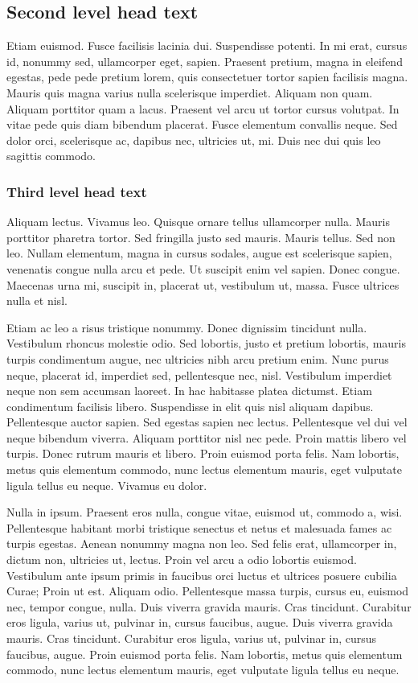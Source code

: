 \documentclass[CJCE,STIX2COL]{WileyNJD-v2}
\begin{document}
\subsection{Second level head text}

Etiam euismod. Fusce facilisis lacinia dui. Suspendisse potenti. In mi erat, cursus id, nonummy sed, ullamcorper
eget, sapien. Praesent pretium, magna in eleifend egestas, pede pede pretium lorem, quis consectetuer tortor sapien
facilisis magna. Mauris quis magna varius nulla scelerisque imperdiet. Aliquam non quam. Aliquam porttitor quam
a lacus. Praesent vel arcu ut tortor cursus volutpat. In vitae pede quis diam bibendum placerat. Fusce elementum
convallis neque. Sed dolor orci, scelerisque ac, dapibus nec, ultricies ut, mi. Duis nec dui quis leo sagittis commodo.

\subsubsection{Third level head text}

Aliquam lectus. Vivamus leo. Quisque ornare tellus ullamcorper nulla. Mauris porttitor pharetra tortor. Sed fringilla
justo sed mauris. Mauris tellus. Sed non leo. Nullam elementum\cite{ennis1994}, magna in cursus sodales, augue est scelerisque
sapien, venenatis congue nulla arcu et pede. Ut suscipit enim vel sapien. Donec congue. Maecenas urna mi, suscipit
in, placerat ut, vestibulum ut, massa. Fusce ultrices nulla et nisl.

Etiam ac leo a risus tristique nonummy. Donec dignissim tincidunt nulla. Vestibulum rhoncus molestie odio. Sed
lobortis, justo et pretium lobortis, mauris turpis condimentum augue, nec ultricies nibh arcu pretium enim. Nunc
purus neque, placerat id, imperdiet sed, pellentesque nec, nisl. Vestibulum imperdiet neque non sem accumsan laoreet.
In hac habitasse platea dictumst. Etiam condimentum facilisis libero. Suspendisse in elit quis nisl aliquam dapibus.
Pellentesque auctor sapien. Sed egestas sapien nec lectus. Pellentesque vel dui vel neque bibendum viverra. Aliquam
porttitor nisl nec pede. Proin mattis libero vel turpis. Donec rutrum mauris et libero. Proin euismod porta felis.
Nam lobortis, metus quis elementum commodo, nunc lectus elementum mauris, eget vulputate ligula tellus eu neque.
Vivamus eu dolor.

Nulla in ipsum. Praesent eros nulla, congue vitae, euismod ut, commodo a, wisi. Pellentesque habitant morbi
tristique senectus et netus et malesuada fames ac turpis egestas. Aenean nonummy magna non leo. Sed felis erat,
ullamcorper in, dictum non, ultricies ut, lectus. Proin vel arcu a odio lobortis euismod. Vestibulum ante ipsum primis
in faucibus orci luctus et ultrices posuere cubilia Curae; Proin ut est. Aliquam odio. Pellentesque massa turpis, cursus
eu, euismod nec, tempor congue, nulla. Duis viverra gravida mauris. Cras tincidunt. Curabitur eros ligula, varius ut,
pulvinar in, cursus faucibus, augue. Duis viverra gravida mauris. Cras tincidunt. Curabitur eros ligula, varius ut,
pulvinar in, cursus faucibus, augue. Proin euismod porta felis. Nam lobortis, metus quis elementum commodo, nunc lectus elementum mauris, eget vulputate ligula tellus eu neque.
\end{document}
